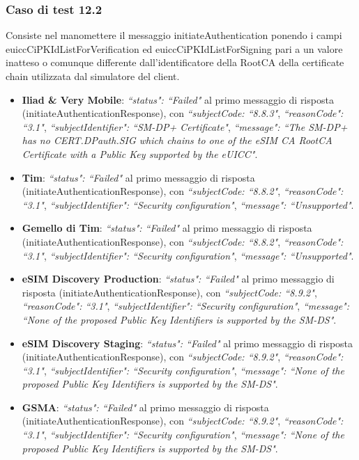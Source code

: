 \documentclass[10pt, oneside]{book}
\begin{document}
\subsubsection{Caso di test 12.2}
Consiste nel manomettere il messaggio initiateAuthentication ponendo i campi euiccCiPKIdListForVerification ed euiccCiPKIdListForSigning pari a un valore inatteso o comunque differente dall'identificatore della RootCA della certificate chain utilizzata dal simulatore del client.
\begin{itemize}
\item \textbf{Iliad \& Very Mobile}: \textit{``status": ``Failed"} al primo messaggio di risposta (initiateAuthenticationResponse), con \textit{``subjectCode: ``8.8.3"}, \textit{``reasonCode": ``3.1"}, \textit{``subjectIdentifier": ``SM-DP+ Certificate"}, \textit{``message": ``The SM-DP+ has no CERT.DPauth.SIG which chains to one of the eSIM CA RootCA Certificate with a Public Key supported by the eUICC"}.
\item \textbf{Tim}: \textit{``status": ``Failed"} al primo messaggio di risposta (initiateAuthenticationResponse), con \textit{``subjectCode: ``8.8.2"}, \textit{``reasonCode": ``3.1"}, \textit{``subjectIdentifier": ``Security configuration"}, \textit{``message": ``Unsupported"}.
\item \textbf{Gemello di Tim}: \textit{``status": ``Failed"} al primo messaggio di risposta (initiateAuthenticationResponse), con \textit{``subjectCode: ``8.8.2"}, \textit{``reasonCode": ``3.1"}, \textit{``subjectIdentifier": ``Security configuration"}, \textit{``message": ``Unsupported"}.
\item \textbf{eSIM Discovery Production}: \textit{``status": ``Failed"} al primo messaggio di risposta (initiateAuthenticationResponse), con \textit{``subjectCode: ``8.9.2"}, \textit{``reasonCode": ``3.1"}, \textit{``subjectIdentifier": ``Security configuration"}, \textit{``message": ``None of the proposed Public Key Identifiers is supported by the SM-DS"}.
\item \textbf{eSIM Discovery Staging}: \textit{``status": ``Failed"} al primo messaggio di risposta (initiateAuthenticationResponse), con \textit{``subjectCode: ``8.9.2"}, \textit{``reasonCode": ``3.1"}, \textit{``subjectIdentifier": ``Security configuration"}, \textit{``message": ``None of the proposed Public Key Identifiers is supported by the SM-DS"}.
\item \textbf{GSMA}: \textit{``status": ``Failed"} al primo messaggio di risposta (initiateAuthenticationResponse), con \textit{``subjectCode: ``8.9.2"}, \textit{``reasonCode": ``3.1"}, \textit{``subjectIdentifier": ``Security configuration"}, \textit{``message": ``None of the proposed Public Key Identifiers is supported by the SM-DS"}.

\end{itemize}
\end{document}
